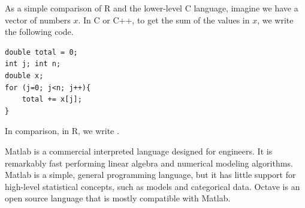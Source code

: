 As a simple comparison of R and the lower-level C language, imagine we
have a vector of numbers $x$. In C or C++, to get the sum of the
values in $x$, we write the following code.
\begin{verbatim}
double total = 0;
int j; int n;
double x;
for (j=0; j<n; j++){
    total += x[j];
}
\end{verbatim}
In comparison, in R, we write .

Matlab is a commercial interpreted language designed for
engineers.  It is remarkably fast performing linear algebra and
numerical modeling algorithms.  Matlab is a simple, general
programming language, but it has little support for high-level
statistical concepts, such as models and categorical data.  Octave is
an open source language that is mostly compatible with Matlab.

